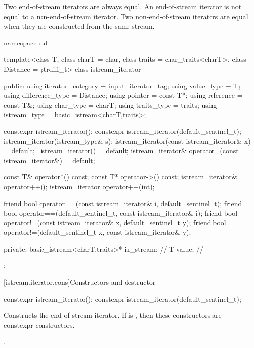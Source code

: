 \pnum
Two end-of-stream iterators are always equal.
An end-of-stream iterator is not
equal to a non-end-of-stream iterator.
Two non-end-of-stream iterators are equal when they are constructed from the same stream.

\begin{codeblock}
namespace std {
  template<class T, class charT = char, class traits = char_traits<charT>,
           class Distance = ptrdiff_t>
  class istream_iterator {
  public:
    using iterator_category = input_iterator_tag;
    using value_type        = T;
    using difference_type   = Distance;
    using pointer           = const T*;
    using reference         = const T&;
    using char_type         = charT;
    using traits_type       = traits;
    using istream_type      = basic_istream<charT,traits>;

    constexpr istream_iterator();
    constexpr istream_iterator(default_sentinel_t);
    istream_iterator(istream_type& s);
    istream_iterator(const istream_iterator& x) = default;
    ~istream_iterator() = default;
    istream_iterator& operator=(const istream_iterator&) = default;

    const T& operator*() const;
    const T* operator->() const;
    istream_iterator& operator++();
    istream_iterator  operator++(int);

    friend bool operator==(const istream_iterator& i, default_sentinel_t);
    friend bool operator==(default_sentinel_t, const istream_iterator& i);
    friend bool operator!=(const istream_iterator& x, default_sentinel_t y);
    friend bool operator!=(default_sentinel_t x, const istream_iterator& y);

  private:
    basic_istream<charT,traits>* in_stream; // \expos
    T value;                                // \expos
  };
}
\end{codeblock}

[istream.iterator.cons]{Constructors and destructor}

%
\begin{itemdecl}
constexpr istream_iterator();
constexpr istream_iterator(default_sentinel_t);
\end{itemdecl}

\begin{itemdescr}
\pnum
\effects
Constructs the end-of-stream iterator.
If  is ,
then these constructors are constexpr constructors.

\pnum
\ensures {}.
\end{itemdescr}


